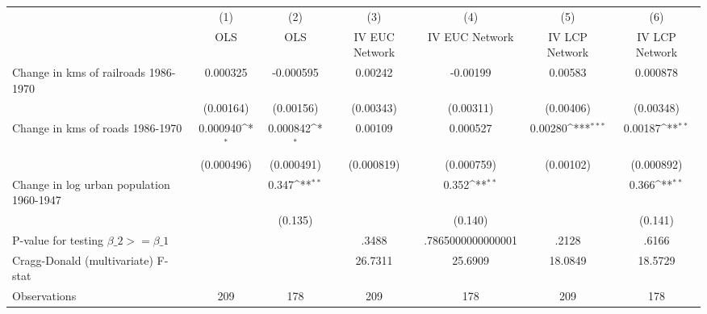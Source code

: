 {
\def\sym#1{\ifmmode^{#1}\else\(^{#1}\)\fi}
\begin{tabular}{l*{6}{c}}
\hline\hline
                &\multicolumn{1}{c}{(1)}&\multicolumn{1}{c}{(2)}&\multicolumn{1}{c}{(3)}&\multicolumn{1}{c}{(4)}&\multicolumn{1}{c}{(5)}&\multicolumn{1}{c}{(6)}\\
                &\multicolumn{1}{c}{OLS}&\multicolumn{1}{c}{OLS}&\multicolumn{1}{c}{IV EUC Network}&\multicolumn{1}{c}{IV EUC Network}&\multicolumn{1}{c}{IV LCP Network}&\multicolumn{1}{c}{IV LCP Network}\\
\hline
Change in kms of railroads 1986-1970& 0.000325         &-0.000595         &  0.00242         & -0.00199         &  0.00583         & 0.000878         \\
                &(0.00164)         &(0.00156)         &(0.00343)         &(0.00311)         &(0.00406)         &(0.00348)         \\
[1em]
Change in kms of roads 1986-1970& 0.000940\sym{*}  & 0.000842\sym{*}  &  0.00109         & 0.000527         &  0.00280\sym{***}&  0.00187\sym{**} \\
                &(0.000496)         &(0.000491)         &(0.000819)         &(0.000759)         &(0.00102)         &(0.000892)         \\
[1em]
Change in log urban population 1960-1947&                  &    0.347\sym{**} &                  &    0.352\sym{**} &                  &    0.366\sym{**} \\
                &                  &  (0.135)         &                  &  (0.140)         &                  &  (0.141)         \\
\hline
P-value for testing $\beta\_{2} >= \beta\_{1}$&                  &                  &    .3488         &.7865000000000001         &    .2128         &    .6166         \\
Cragg-Donald (multivariate) F-stat&                  &                  &  26.7311         &  25.6909         &  18.0849         &  18.5729         \\
Observations    &      209         &      178         &      209         &      178         &      209         &      178         \\
\hline\hline
\end{tabular}
}
